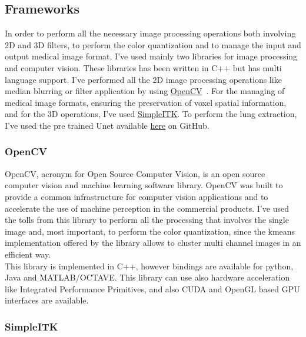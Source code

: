 \documentclass{standalone}
\begin{document}
	
	\subsection{Frameworks}
	
	In order to perform all the necessary image processing operations both involving 2D and 3D filters, to perform the color quantization and to manage the input and output medical image format, I've used mainly two libraries for image processing and computer vision. These libraries has been written in C++ but has multi language support. I've performed all the 2D image processing operations like median blurring or filter application by using \href{https://opencv.org/}{OpenCV}~\cite{OpenCV}. For the managing of medical image formats, ensuring the preservation of voxel spatial information, and for the 3D operations, I've used \href{https://simpleitk.org/}{SimpleITK}. To perform the lung extraction, I've used the pre trained Unet available \href{https://github.com/JoHof/lungmask}{here} on GitHub.
	
	\subsubsection*{OpenCV} 
	
	OpenCV, acronym for Open Source Computer Vision,  is an open source computer vision and machine learning software library. OpenCV was built to provide a common infrastructure for computer vision applications and to accelerate the use of machine perception in the commercial products.
	I've used the tolls from this library to perform all the processing that involves the single image and, most important, to perform the color quantization, since the kmeans implementation offered by the library allows to cluster multi channel images in an efficient way.\\	
	This library is implemented in C++, however bindings are available for python, Java and MATLAB/OCTAVE. This library can use also hardware acceleration like Integrated Performance Primitives, and also CUDA and OpenGL based GPU interfaces are available.\\
	
	\subsubsection*{SimpleITK} 
	
\end{document}
